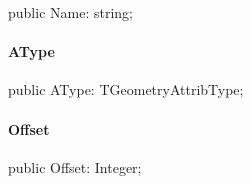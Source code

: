 \documentclass{report}
\begin{document}
\begin{list}{}{
\setlength{\itemindent}{0cm}
\setlength{\listparindent}{0cm}
\setlength{\leftmargin}{\evensidemargin}
\addtolength{\leftmargin}{\tmplength}
\settowidth{\labelsep}{X}
\addtolength{\leftmargin}{\labelsep}
\setlength{\labelwidth}{\tmplength}
}
\begin{flushleft}
\item[\textbf{Declaration}\hfill]
\begin{ttfamily}
public Name: string;\end{ttfamily}


\end{flushleft}
\end{list}
\paragraph*{AType}\hspace*{\fill}

\begin{list}{}{
\setlength{\itemindent}{0cm}
\setlength{\listparindent}{0cm}
\setlength{\leftmargin}{\evensidemargin}
\addtolength{\leftmargin}{\tmplength}
\settowidth{\labelsep}{X}
\addtolength{\leftmargin}{\labelsep}
\setlength{\labelwidth}{\tmplength}
}
\begin{flushleft}
\item[\textbf{Declaration}\hfill]
\begin{ttfamily}
public AType: TGeometryAttribType;\end{ttfamily}


\end{flushleft}
\end{list}
\paragraph*{Offset}\hspace*{\fill}

\begin{list}{}{
\setlength{\itemindent}{0cm}
\setlength{\listparindent}{0cm}
\setlength{\leftmargin}{\evensidemargin}
\addtolength{\leftmargin}{\tmplength}
\settowidth{\labelsep}{X}
\addtolength{\leftmargin}{\labelsep}
\setlength{\labelwidth}{\tmplength}
}
\begin{flushleft}
\item[\textbf{Declaration}\hfill]
\begin{ttfamily}
public Offset: Integer;\end{ttfamily}


\end{flushleft}
\end{list}
\end{document}
